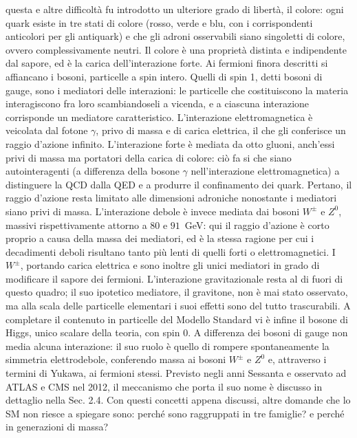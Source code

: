\documentclass[11pt,a4paper,twoside,openright]{report}
\begin{document}
questa e altre difficoltà fu introdotto un ulteriore grado di libertà, il colore: ogni quark esiste in tre stati di colore (rosso, verde e blu, con i
corrispondenti anticolori per gli antiquark) e che gli adroni osservabili siano
singoletti di colore, ovvero complessivamente neutri. Il colore è una proprietà
distinta e indipendente dal sapore, ed è la carica dell'interazione forte. Ai fermioni finora descritti si affiancano i bosoni, particelle a spin intero. Quelli
di spin 1, detti bosoni di gauge, sono i mediatori delle interazioni: le particelle che costituiscono la materia interagiscono fra loro scambiandoseli a vicenda, e a ciascuna interazione corrisponde un mediatore caratteristico. L'interazione elettromagnetica è veicolata dal fotone $\gamma$, privo di massa e di carica elettrica, il che gli conferisce un raggio d'azione infinito. L'interazione forte è mediata da otto gluoni, anch'essi privi di massa ma
portatori della carica di colore: ciò fa si che siano autointeragenti (a differenza della bosone $\gamma$ nell'interazione elettromagnetica) a distinguere la QCD dalla QED e a produrre il confinamento dei quark. Pertano, il raggio d'azione resta limitato alle dimensioni adroniche nonostante i mediatori siano privi di massa. L'interazione debole è invece mediata dai bosoni
$W^\pm$ e $Z^0$, massivi rispettivamente attorno a $80$ e $91$~GeV: qui il raggio
d'azione è corto proprio a causa della massa dei mediatori, ed è la stessa ragione per
cui i decadimenti deboli risultano tanto più lenti di quelli forti o elettromagnetici.
I $W^\pm$, portando carica elettrica e sono inoltre gli unici mediatori in grado di
modificare il sapore dei fermioni. L'interazione gravitazionale resta al di fuori di
questo quadro; il suo ipotetico mediatore, il gravitone, non è mai stato osservato, ma
alla scala delle particelle elementari i suoi effetti sono del tutto trascurabili. A completare il contenuto in particelle del Modello Standard vi è infine il bosone di Higgs, unico scalare della teoria, con spin $0$. A differenza dei bosoni di gauge non media alcuna interazione: il suo ruolo è quello di rompere spontaneamente la simmetria elettrodebole, conferendo massa ai bosoni $W^\pm$ e $Z^0$ e, attraverso i termini di Yukawa, ai fermioni stessi. Previsto negli anni Sessanta e osservato ad ATLAS e CMS nel 2012, il meccanismo che porta il suo nome è discusso in dettaglio nella Sec. 2.4. Con questi concetti appena discussi, altre domande che lo SM non riesce a spiegare sono: perché sono raggruppati in tre famiglie? e perché in generazioni di massa?
\end{document}
